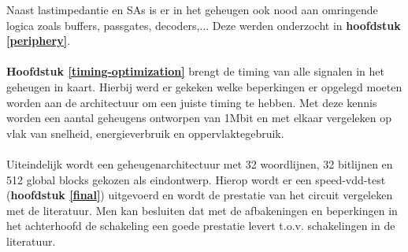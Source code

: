 Naast lastimpedantie en SAs is er in het geheugen ook nood aan omringende logica zoals buffers, passgates, decoders,... Deze werden onderzocht in \textbf{hoofdstuk \ref{periphery}}.\\\\
\textbf{Hoofdstuk \ref{timing-optimization}} brengt de timing van alle signalen in het geheugen in kaart. Hierbij werd er gekeken welke beperkingen er opgelegd moeten worden aan de architectuur om een juiste timing te hebben. Met deze kennis worden een aantal geheugens ontworpen van 1Mbit en met elkaar vergeleken op vlak van snelheid, energieverbruik en oppervlaktegebruik.\\\\
Uiteindelijk wordt een geheugenarchitectuur met 32 woordlijnen, 32 bitlijnen en 512 global blocks gekozen als eindontwerp. Hierop wordt er een speed-vdd-test (\textbf{hoofdstuk \ref{final}}) uitgevoerd en wordt de prestatie van het circuit vergeleken met de literatuur. Men kan besluiten dat met de afbakeningen en beperkingen in het achterhoofd de schakeling een goede prestatie levert t.o.v. schakelingen in de literatuur.
